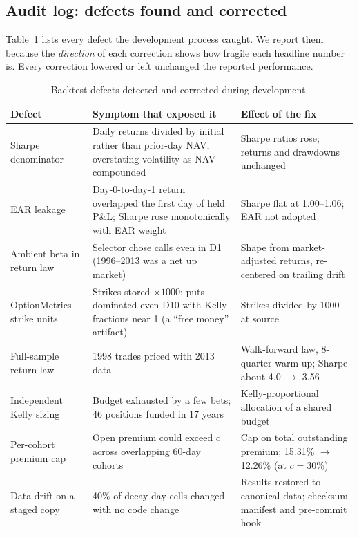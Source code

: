 \documentclass[11pt]{article}
\theoremstyle{definition}
\newcommand{\1}{\mathbf{1}}
\begin{document}
\subsection{Audit log: defects found and corrected}

Table~\ref{tab:audit} lists every defect the development process caught. We report them
because the \emph{direction} of each correction shows how fragile each headline number
is. Every correction lowered or left unchanged the reported performance.

\begin{table}[t]\centering\small
\caption{Backtest defects detected and corrected during development.}\label{tab:audit}
\begin{tabularx}{\linewidth}{@{}p{3.2cm}Xp{3.3cm}@{}}
\toprule
Defect & Symptom that exposed it & Effect of the fix\\
\midrule
Sharpe denominator & Daily returns divided by initial rather than prior-day NAV, overstating volatility as NAV compounded & Sharpe ratios rose; returns and drawdowns unchanged\\
EAR leakage & Day-0-to-day-1 return overlapped the first day of held P\&L; Sharpe rose monotonically with EAR weight & Sharpe flat at 1.00--1.06; EAR not adopted\\
Ambient beta in return law & Selector chose calls even in D1 (1996--2013 was a net up market) & Shape from market-adjusted returns, re-centered on trailing drift\\
OptionMetrics strike units & Strikes stored $\times1000$; puts dominated even D10 with Kelly fractions near 1 (a ``free money'' artifact) & Strikes divided by 1000 at source\\
Full-sample return law & 1998 trades priced with 2013 data & Walk-forward law, 8-quarter warm-up; Sharpe about 4.0 $\to$ 3.56\\
Independent Kelly sizing & Budget exhausted by a few bets; 46 positions funded in 17 years & Kelly-proportional allocation of a shared budget\\
Per-cohort premium cap & Open premium could exceed $c$ across overlapping 60-day cohorts & Cap on total outstanding premium; 15.31\% $\to$ 12.26\% (at $c=30\%$)\\
Data drift on a staged copy & 40\% of decay-day cells changed with no code change & Results restored to canonical data; checksum manifest and pre-commit hook\\
\bottomrule
\end{tabularx}
\end{table}
\end{document}
